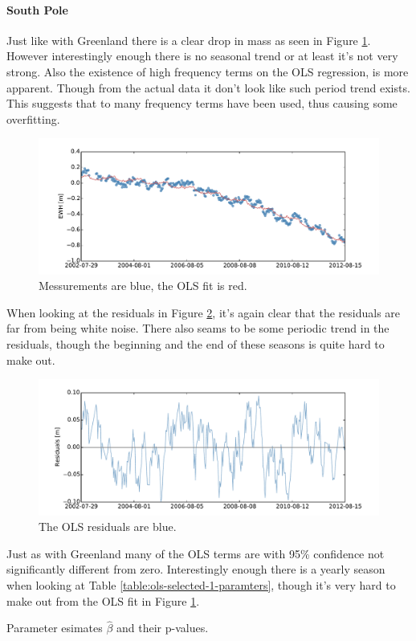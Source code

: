 \paragraph{South Pole}

Just like with Greenland there is a clear drop in mass as seen in Figure \ref{fig:ols-selected-1-fit}. However interestingly enough there is no seasonal trend or at least it's not very strong. Also the existence of high frequency terms on the OLS regression, is more apparent. Though from the actual data it don't look like such period trend exists. This suggests that to many frequency terms have been used, thus causing some overfitting.
\begin{figure}[H]
	\centering
	\includegraphics[width=\textwidth]{figures/ols-selected-1-fit}
	\caption{Messurements are blue, the OLS fit is red.}
	\label{fig:ols-selected-1-fit}
\end{figure}

When looking at the residuals in Figure \ref{fig:ols-selected-1-residual}, it's again clear that the residuals are far from being white noise. There also seams to be some periodic trend in the residuals, though the beginning and the end of these seasons is quite hard to make out. 

\begin{figure}[H]
	\centering
	\includegraphics[width=\textwidth]{figures/ols-selected-1-residual}
	\caption{The OLS residuals are blue.}
	\label{fig:ols-selected-1-residual}
\end{figure}

Just as with Greenland many of the OLS terms are with 95\% confidence not significantly different from zero. Interestingly enough there is a yearly season when looking at Table \ref{table:ols-selected-1-paramters}, though it's very hard to make out from the OLS fit in Figure \ref{fig:ols-selected-1-fit}.

\begin{table}[H]
\centering
\centerline{}
\caption{Parameter esimates $\hat{\beta}$ and their p-values. }
\label{table:ols-selected-1-paramters}
\end{table}

